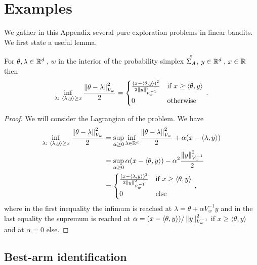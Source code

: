 \section{Examples}\label{app:lgc.examples}

We gather in this Appendix several pure exploration problems in linear bandits. We first state a useful lemma.

\begin{lemma}\label{lem:lagrange_alternative}
For $\theta, \lambda \in \mathbb{R}^d\,$, $w$ in the interior of the probability simplex $\overset{\circ}{\Sigma_A}$, $y\in\mathbb{R}^d\,$, $x\in\mathbb{R}$ then
\[
\inf_{\lambda:\ \langle \lambda,y\rangle \geq x} \frac{\left\lVert\theta-\lambda\right\rVert^2_{V_w}}{2} = \begin{cases}
\frac{(x - \langle\theta,y\rangle)^2}{2 \left\lVert y\right\rVert_{V_w^{-1}}^2} &\text{if } x \geq \langle\theta,y\rangle \\
0 &\text{otherwise}
\end{cases}\,.
\]
\end{lemma}
\begin{proof}
We will consider the Lagrangian of the problem. We have
\begin{align*}
  \inf_{\lambda:\ \langle \lambda,y \rangle \geq x} \frac{\left\lVert\theta-\lambda\right\rVert^2_{V_w}}{2}
  &= \sup_{\alpha \geq 0}\inf_{\lambda \in \mathbb{R}^d} \frac{\left\lVert\theta-\lambda\right\rVert^2_{V_w}}{2}+ \alpha (x-\langle\lambda,y\rangle)\\
  &=  \sup_{\alpha \geq 0} \alpha (x-\langle\theta,y\rangle) - \alpha^2 \frac{\left\lVert y\right\rVert^2_{V_w^{-1}}}{2}\\
  &= \begin{cases}
  \frac{(x - \langle\lambda,y\rangle)^2}{2 \left\lVert y\right\rVert_{V_w^{-1}}^2} &\text{if } x \geq \langle\theta,y\rangle \\
  0 &\text{else}
  \end{cases}\,,
\end{align*}
where in the first inequality the infimum is reached at $\lambda = \theta + \alpha V_w^{-1} y$ and in the last equality the supremum is reached at $\alpha = (x- \langle\theta,y\rangle)/\left\lVert y\right\rVert_{V_w^{-1}}^2$ if $x \geq \langle\theta,y\rangle$ and at $\alpha = 0$ else.
\end{proof}

\subsection{Best-arm identification}\label{app:lgc.examples.bai}

